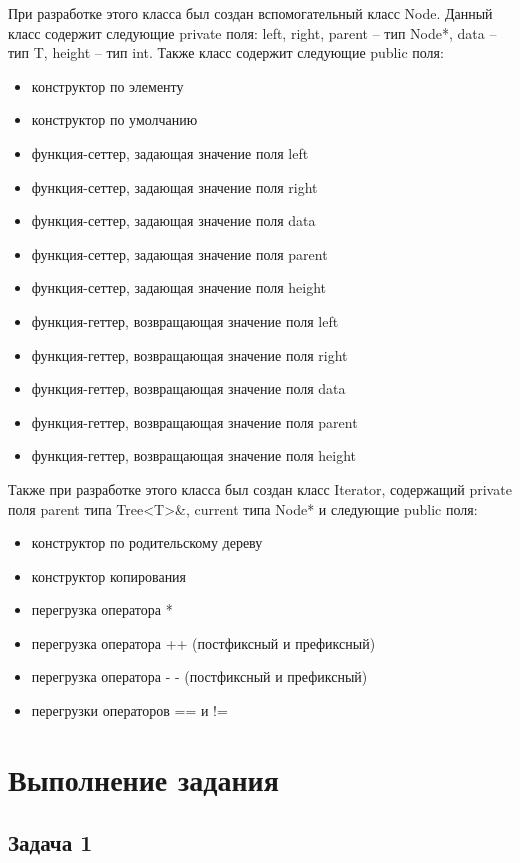\documentclass[a4paper,12pt]{article}
\begin{document}
При разработке этого класса был создан вспомогательный класс Node. Данный класс содержит следующие private поля: left, right, parent -- тип Node*, data -- тип T, height -- тип int. Также класс содержит следующие public поля:
\begin{itemize}
  \item конструктор по элементу
  \item конструктор по умолчанию
  \item функция-сеттер, задающая значение поля left
  \item функция-сеттер, задающая значение поля right
  \item функция-сеттер, задающая значение поля data
  \item функция-сеттер, задающая значение поля parent
  \item функция-сеттер, задающая значение поля height
  \item функция-геттер, возвращающая значение поля left
  \item функция-геттер, возвращающая значение поля right
  \item функция-геттер, возвращающая значение поля data
  \item функция-геттер, возвращающая значение поля parent
  \item функция-геттер, возвращающая значение поля height
\end{itemize} 

Также при разработке этого класса был создан класс Iterator, содержащий private поля parent типа Tree<T>&, current типа Node* и следующие public поля:
\begin{itemize}
  \item конструктор по родительскому дереву
  \item конструктор копирования
  \item перегрузка оператора *
  \item перегрузка оператора ++ (постфиксный и префиксный)
  \item перегрузка оператора - - (постфиксный и префиксный)
  \item перегрузки операторов == и !=
\end{itemize} 

\section{Выполнение задания}
\subsection{Задача 1}
\end{document}
